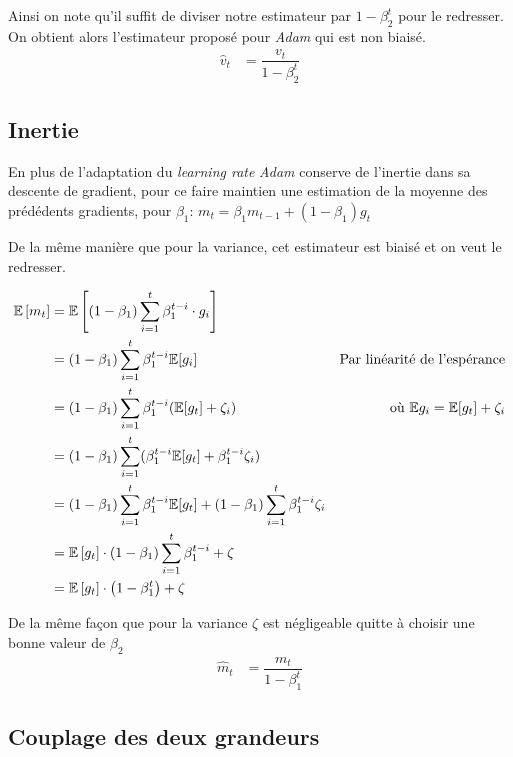 \documentclass[fleqn,11pt, titlepage, french]{article}
\begin{document}
	Ainsi on note qu'il suffit de diviser notre estimateur par $1-\beta_{2}^{t}$ pour le redresser. On obtient alors l'estimateur proposé pour \emph{Adam} qui est non biaisé.
	\begin{align*}
		\hat{v}_t &= \dfrac{v_t}{1 - \beta^t_2}
	\end{align*}
	
	\subsection{Inertie}
	
	En plus de l'adaptation du \emph{learning rate} \emph{Adam} conserve de l'inertie dans sa descente de gradient, pour ce faire maintien une estimation de la moyenne des prédédents gradients, pour $\beta_1$: $m_t = \beta_1 m_{t-1} + (1-\beta_1) g_t$
	
	De la même manière que pour la variance, cet estimateur est biaisé et on veut le redresser.
	
	\begin{align*} 
	\mathbb{E}\left[m_{t}\right] &=\mathbb{E}\left[\left(1-\beta_{1}\right) \sum_{i=1}^{t} \beta_{1}^{t-i} \cdot g_{i}\right] \\ 
	&=\left(1-\beta_{1}\right) \sum_{i=1}^{t} \beta_{1}^{t-i}  \mathbb{E} [g_{i}] &\text{Par linéarité de l'espérance} \\ 
	&=\left(1-\beta_{1}\right) \sum_{i=1}^{t} \beta_{1}^{t-i}  (\mathbb{E} [g_{t}] + \zeta_i)  		&\text{où $\mathbb{E} g_{i} = \mathbb{E}[g_{t}] + \zeta_i$} \\
	&=\left(1-\beta_{1}\right) \sum_{i=1}^{t} (\beta_{1}^{t-i}  \mathbb{E} [g_{t}] + \beta_{1}^{t-i} \zeta_i) \\
	&=\left(1-\beta_{1}\right) \sum_{i=1}^{t} \beta_{1}^{t-i}  \mathbb{E} [g_{t}] + \left(1-\beta_{1}\right) \sum_{i=1}^{t} \beta_{1}^{t-i} \zeta_i \\
	&=\mathbb{E}\left[g_{t}\right] \cdot\left(1-\beta_{1}\right) \sum_{i=1}^{t} \beta_{1}^{t-i}+\zeta \\ 
	&=\mathbb{E}\left[g_{t}\right] \cdot\left(1-\beta_{1}^{t}\right)+\zeta
	\end{align*}
	
	De la même façon que pour la variance $\zeta$ est négligeable quitte à choisir une bonne valeur de $\beta_{2}$
	\begin{align*}
		\hat{m}_t &= \dfrac{m_t}{1 - \beta^t_1}
	\end{align*}
	
	\subsection{Couplage des deux grandeurs}
	
\end{document}
